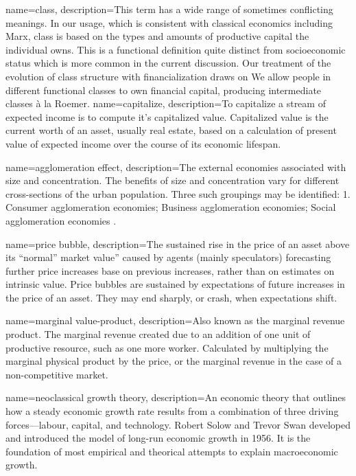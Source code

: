 {
name=class,
description={This term has a wide range of sometimes conflicting meanings. In our usage, which is consistent with classical economics including Marx, class is based on the types and amounts of productive capital the individual owns. This is a functional definition quite distinct from socioeconomic status which is more common in the current discussion. Our treatment of the evolution of class structure with financialization draws on We allow  people in different functional classes to own financial capital, producing intermediate classes \`a la Roemer\cite{roemerGeneralTheoryExploitation1982}.}
}
{
name=capitalize,
description={To capitalize a stream of expected income is to compute it's capitalized value. Capitalized value is the current worth of an asset, usually real estate, based on a calculation of present value of expected income over the course of its economic lifespan.}
}

{
name=agglomeration effect,
description={The external economies associated with size and concentration. The benefits of size and concentration vary for different cross-sections of the urban population. Three such groupings may be identified: 1. Consumer agglomeration economies; Business agglomeration economies; Social agglomeration economies \cite{carlinoAgglomerationEconomiesSurvey1978}.}
}

{
name=price bubble,
description={The sustained rise in the price of an asset above its ``normal'' market value'' caused by agents (mainly speculators) forecasting further price increases base on previous increases, rather than on estimates on intrinsic value.  Price bubbles are sustained by expectations of future increases in the price of an asset. They may end sharply, or crash, when expectations shift.}
}

{
name=marginal value-product,
description={Also known as the marginal revenue product. The marginal revenue created due to an addition of one unit of productive resource, such as one more worker. Calculated by multiplying the marginal physical product by the price, or the marginal revenue in the case of a non-competitive market.}
}

{
name=neoclassical growth theory,
description={An economic theory that outlines how a steady economic growth rate results from a combination of three driving forces---labour, capital, and technology. Robert Solow and Trevor Swan developed and introduced the model of long-run economic growth in 1956. It is the  foundation of most empirical and theorical attempts to explain macroeconomic growth.}
}


